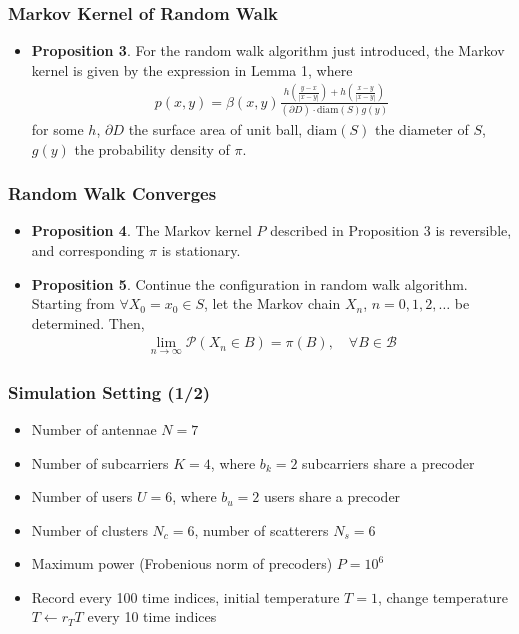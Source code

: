 \documentclass{beamer}
\begin{document}
\begin{frame}
	\frametitle{Markov Kernel of Random Walk}
	\begin{itemize}
	\item \textbf{Proposition 3}. For the random walk algorithm just introduced, the Markov kernel is given by the expression in Lemma 1, where
	\begin{gather*}
	p(x,y)
	=\beta(x,y) \frac {h\left( \frac{y-x}{|x-y|} \right) +h\left( \frac{x-y}{|x-y|} \right) } {(\partial D) \cdot \mathrm{diam}(S) g(y)}
	\end{gather*}
	for some \(h\), \(\partial D\) the surface area of unit ball, \(\mathrm{diam}(S)\) the diameter of \(S\), \(g(y)\) the probability density of \(\pi\).
	\end{itemize}
\end{frame}


\begin{frame}
	\frametitle{Random Walk Converges}
	\begin{itemize}
	\item \textbf{Proposition 4}. The Markov kernel \(P\) described in Proposition 3 is reversible, and corresponding \(\pi\) is stationary.
	
	\item \textbf{Proposition 5}. Continue the configuration in random walk algorithm.
	Starting from \(\forall X_0 =x_0 \in S\), let the Markov chain \(X_n\), \(n=0,1,2,\dotsc\) be determined.
	Then,
	\begin{gather*}
	\lim_{n \to \infty} \mathcal{P}(X_n \in B)
	=\pi(B),
	\quad \forall B \in \mathcal{B}
	\end{gather*}
	\end{itemize}
\end{frame}


\begin{frame}
	\frametitle{Simulation Setting (1/2)}
	\begin{itemize}
	\item Number of antennae \(N =7\)
	\item Number of subcarriers \(K =4\), where \(b_k =2\) subcarriers share a precoder
	\item Number of users \(U =6\), where \(b_u =2\) users share a precoder
	\item Number of clusters \(N_c =6\), number of scatterers \(N_s =6\)
	\item Maximum power (Frobenious norm of precoders) \(P =10^6\)
	\item Record every 100 time indices, initial temperature \(T=1\), change temperature \(T \leftarrow r_T T\) every 10 time indices
	\end{itemize}
\end{frame}
\end{document}
